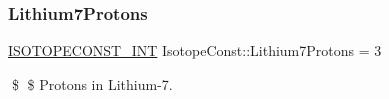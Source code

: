 \subsubsection{\texorpdfstring{Lithium7\+Protons}{Lithium7Protons}}
{\footnotesize\ttfamily \mbox{\hyperlink{group___isotope_const-_macros_ga5f18360b3e99483a35c32d789e62621c}{I\+S\+O\+T\+O\+P\+E\+C\+O\+N\+S\+T\+\_\+\+I\+NT}} Isotope\+Const\+::\+Lithium7\+Protons = 3}

\$ \$ Protons in Lithium-\/7. 